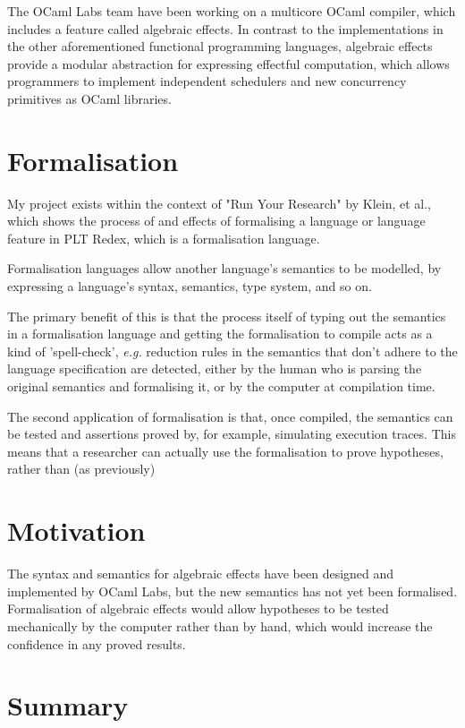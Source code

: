 \documentclass[12pt,a4paper,twoside,openright]{report}
\begin{document}
The OCaml Labs team have been working on a multicore OCaml compiler, which includes a feature called algebraic effects. In contrast to the implementations in the other aforementioned functional programming languages, algebraic effects provide a modular abstraction for expressing effectful computation, which allows programmers to implement independent schedulers and new concurrency primitives as OCaml libraries.

\section{Formalisation}

My project exists within the context of "Run Your Research" by Klein, et al.\cite{Klein2012}, which shows the process of and effects of formalising a language or language feature in PLT Redex, which is a formalisation language.

Formalisation languages allow another language's semantics to be modelled, by expressing a language's syntax, semantics, type system, and so on. 

The primary benefit of this is that the process itself of typing out the semantics in a formalisation language and getting the formalisation to compile acts as a kind of 'spell-check', \textit{e.g.} reduction rules in the semantics that don't adhere to the language specification are detected, either by the human who is parsing the original semantics and formalising it, or by the computer at compilation time.

The second application of formalisation is that, once compiled, the semantics can be tested and assertions proved by, for example, simulating execution traces. This means that a researcher can actually use the formalisation to prove hypotheses, rather than (as previously) 

\section{Motivation}

The syntax and semantics for algebraic effects have been designed and implemented by OCaml Labs, but the new semantics has not yet been formalised. Formalisation of algebraic effects would allow hypotheses to be tested mechanically by the computer rather than by hand, which would increase the confidence in any proved results.

\section{Summary}
\end{document}
